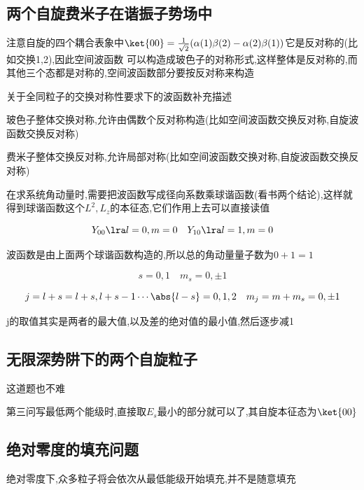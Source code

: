         \subsection{两个自旋费米子在谐振子势场中}
            注意自旋的四个耦合表象中$\ket{00} = \frac{1}{\sqrt{2}} (\alpha(1)\beta(2) - \alpha(2)\beta(1))$它是反对称的(比如交换1,2),因此空间波函数
            可以构造成玻色子的对称形式,这样整体是反对称的,而其他三个态都是对称的,空间波函数部分要按反对称来构造
            \begin{formal}
                关于全同粒子的交换对称性要求下的波函数补充描述
                
                玻色子整体交换对称,允许由偶数个反对称构造(比如空间波函数交换反对称,自旋波函数交换反对称)
                
                费米子整体交换反对称,允许局部对称(比如空间波函数交换对称,自旋波函数交换反对称)
            \end{formal}
            
            在求系统角动量时,需要把波函数写成径向系数乘球谐函数(看书两个结论),这样就得到球谐函数这个$L^{2},L_{z}$的本征态,它们作用上去可以直接读值

            $$Y_{00} \lra l=0,m=0 \quad Y_{10} \lra l=1,m=0 $$

            波函数是由上面两个球谐函数构造的,所以总的角动量量子数为$0+1 =1$

            $$s = 0,1 \quad m_{s} = 0,\pm 1$$

            $$ j = l + s = l+s , l+s-1 \cdots \abs{l-s} =0,1,2 \quad m_{j} = m + m_{s} = 0 , \pm 1 $$

            j的取值其实是两者的最大值,以及差的绝对值的最小值,然后逐步减1
            

        \subsection{无限深势阱下的两个自旋粒子}
            这道题也不难

            第三问写最低两个能级时,直接取$E_{s}$最小的部分就可以了,其自旋本征态为$\ket{00}$

        \subsection{绝对零度的填充问题}
            \begin{formal}
                绝对零度下,众多粒子将会依次从最低能级开始填充,并不是随意填充
            \end{formal}

